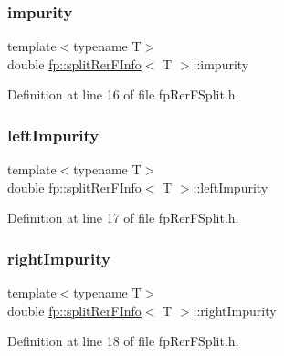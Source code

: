 \subsubsection{\texorpdfstring{impurity}{impurity}}
{\footnotesize\ttfamily template$<$typename T$>$ \\
double \hyperlink{classfp_1_1splitRerFInfo}{fp\+::split\+Rer\+F\+Info}$<$ T $>$\+::impurity\hspace{0.3cm}{\ttfamily [protected]}}



Definition at line 16 of file fp\+Rer\+F\+Split.\+h.

\mbox{\label{classfp_1_1splitRerFInfo_a22a358c2d6a8105bf1af86ed2823d1d1}} 
\subsubsection{\texorpdfstring{left\+Impurity}{leftImpurity}}
{\footnotesize\ttfamily template$<$typename T$>$ \\
double \hyperlink{classfp_1_1splitRerFInfo}{fp\+::split\+Rer\+F\+Info}$<$ T $>$\+::left\+Impurity\hspace{0.3cm}{\ttfamily [protected]}}



Definition at line 17 of file fp\+Rer\+F\+Split.\+h.

\mbox{\label{classfp_1_1splitRerFInfo_ae9c05e45d6da53a663393e4ff2a01c41}} 
\subsubsection{\texorpdfstring{right\+Impurity}{rightImpurity}}
{\footnotesize\ttfamily template$<$typename T$>$ \\
double \hyperlink{classfp_1_1splitRerFInfo}{fp\+::split\+Rer\+F\+Info}$<$ T $>$\+::right\+Impurity\hspace{0.3cm}{\ttfamily [protected]}}



Definition at line 18 of file fp\+Rer\+F\+Split.\+h.

